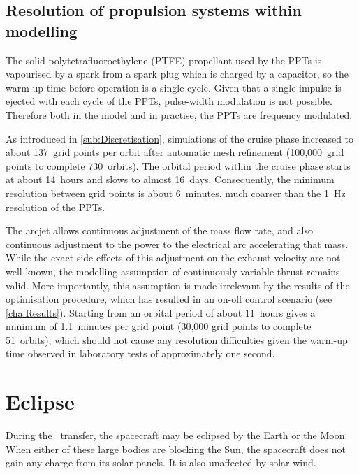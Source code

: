 \subsection{Resolution of propulsion systems within modelling}

The solid polytetrafluoroethylene (PTFE) propellant used by the PPTs is vapourised by a spark from a spark plug which is charged by a capacitor, so the warm-up time before operation is a single cycle. Given that a single impulse is ejected with each cycle of the PPTs, pulse-width modulation is not possible. Therefore both in the model and in practise, the PPTs are frequency modulated. 

As introduced in \autoref{sub:Discretisation}, simulations of the cruise phase increased to about 137~grid points per orbit after automatic mesh refinement (100,000~grid points to complete 730~orbits). The orbital period within the cruise phase starts at about 14~hours and slows to almost 16~days. Consequently, the minimum resolution between grid points is about 6~minutes, much coarser than the 1~Hz resolution of the PPTs.

The arcjet allows continuous adjustment of the mass flow rate, and also continuous adjustment to the power to the electrical arc accelerating that mass. While the exact side-effects of this adjustment on the exhaust velocity are not well known, the modelling assumption of continuously variable thrust remains valid. More importantly, this assumption is made irrelevant by the results of the optimisation procedure, which has resulted in an on-off control scenario (see \autoref{cha:Results}). Starting from an orbital period of about 11~hours gives a minimum of 1.1~minutes per grid point (30,000 grid points to complete 51~orbits), which should not cause any resolution difficulties given the warm-up time observed in laboratory tests of approximately one second. 


\section{Eclipse} \label{sec:Eclipse}

During the \BW\ transfer, the spacecraft may be eclipsed by the Earth or the Moon. When either of these large bodies are blocking the Sun, the spacecraft does not gain any charge from its solar panels. It is also unaffected by solar wind. 


